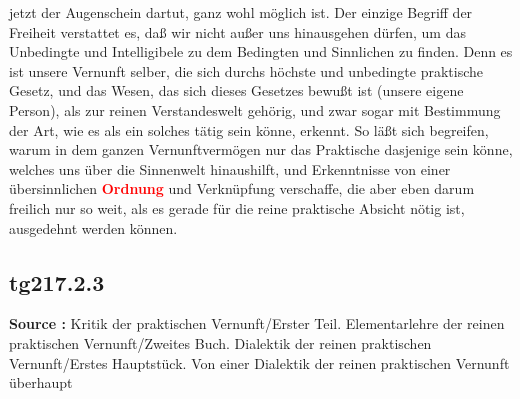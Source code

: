 \documentclass[a4paper,12pt,twoside]{book}
\newcommand{\match}[1]{\textcolor{red}{\textbf{#1}}}
\begin{document}
jetzt der Augenschein dartut, ganz wohl möglich ist. Der einzige Begriff der Freiheit verstattet es, daß wir nicht außer uns hinausgehen dürfen, um das Unbedingte und Intelligibele zu dem Bedingten und Sinnlichen zu finden. Denn es ist unsere Vernunft selber, die sich durchs höchste und unbedingte praktische Gesetz, und das Wesen, das sich dieses Gesetzes bewußt ist (unsere eigene Person), als zur reinen Verstandeswelt gehörig, und zwar sogar mit Bestimmung der Art, wie es als ein solches tätig sein könne, erkennt. So läßt sich begreifen, warum in dem ganzen Vernunftvermögen nur das Praktische dasjenige sein könne, welches uns über die Sinnenwelt hinaushilft, und Erkenntnisse von einer übersinnlichen \match{Ordnung} und Verknüpfung verschaffe, die aber eben darum freilich nur so weit, als es gerade für die reine praktische Absicht nötig ist, ausgedehnt werden können. 
	
	\subsection*{tg217.2.3} 
	\textbf{Source : }Kritik der praktischen Vernunft/Erster Teil. Elementarlehre der reinen praktischen Vernunft/Zweites Buch. Dialektik der reinen praktischen Vernunft/Erstes Hauptstück. Von einer Dialektik der reinen praktischen Vernunft überhaupt\\  
	
\end{document}

